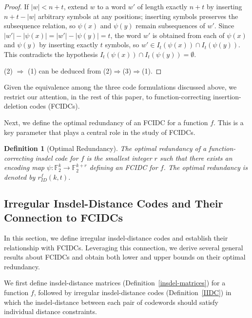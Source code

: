 \documentclass[11 pt]{article}
\numberwithin{equation}{section}
\newtheorem{definition}[theorem]{Definition}
\begin{document}
\begin{proof}
    If $|w| < n + t$, extend $w$ to a word $w'$ of length exactly $n + t$ by inserting $n + t - |w|$ arbitrary symbols at any positions; inserting symbols preserves the subsequence relation, so $\psi(x)$ and $\psi(y)$ remain subsequences of $w'$. Since $|w'| - |\psi(x)| = |w'| - |\psi(y)| = t$, the word $w'$ is obtained from each of $\psi(x)$ and $\psi(y)$ by inserting exactly $t$ symbols, so $w' \in I_t(\psi(x)) \cap I_t(\psi(y))$. This contradicts the hypothesis $I_t(\psi(x)) \cap I_t(\psi(y)) = \emptyset$.

    \smallskip
    \noindent (2) $\Rightarrow$ (1) can be deduced from (2)\(\Rightarrow\)(3)\(\Rightarrow\)(1).
    \end{proof}  
    Given the equivalence among the three code formulations discussed above, we restrict our attention, in the rest of this paper, to {function-correcting insertion-deletion codes} (FCIDCs).
    
    Next, we define the optimal redundancy of an FCIDC for a function $f$. This is a key parameter that plays a central role in the study of FCIDCs.
    
    \begin{definition}[Optimal Redundancy]
    The optimal redundancy of a function-correcting insdel code for $f$ is the smallest integer $r$ such that there exists an encoding map $\psi: \mathbb{F}_2^k \to \mathbb{F}_2^{k+r}$ defining an FCIDC for $f$.
        The optimal redundancy is denoted by \( r^{f}_{ID}(k, t) \).
    \end{definition}
    

    \subsection{Irregular Insdel-Distance Codes and Their Connection to FCIDCs}

    In this section, we define irregular insdel-distance codes and establish their relationship with FCIDCs. Leveraging this connection, we derive several general results about FCIDCs and obtain both lower and upper bounds on their optimal redundancy.

    We first define insdel-distance matrices (Definition~\ref{insdel-matrices}) for a function $f$, followed by irregular insdel-distance codes (Definition~\ref{IIDC}) in which the insdel-distance between each pair of codewords should satisfy individual distance constraints.
    
\end{document}
